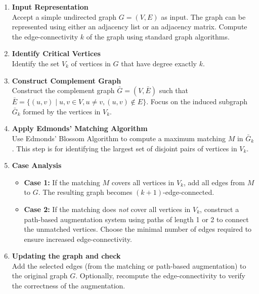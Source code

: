 \documentclass[12pt]{article}
\begin{document}
\begin{enumerate}
    \item \textbf{Input Representation} \\
    Accept a simple undirected graph $G = (V, E)$ as input. The graph can be represented using either an adjacency list or an adjacency matrix. Compute the edge-connectivity $k$ of the graph using standard graph algorithms.

    \item \textbf{Identify Critical Vertices} \\
    Identify the set $V_k$ of vertices in $G$ that have degree exactly $k$. 
    
    \item \textbf{Construct Complement Graph} \\
    Construct the complement graph $\bar{G} = (V, \bar{E})$ such that $\bar{E} = \{(u, v) \mid u, v \in V, u \neq v, (u, v) \notin E\}$. Focus on the induced subgraph $\bar{G}_k$ formed by the vertices in $V_k$.

    \item \textbf{Apply Edmonds’ Matching Algorithm} \\
    Use Edmonds’ Blossom Algorithm to compute a maximum matching $M$ in $\bar{G}_k$. This step is for identifying the largest set of disjoint pairs of vertices in $V_k$.

    \item \textbf{Case Analysis} \\
    \begin{itemize}
        \item \textbf{Case 1:} If the matching $M$ covers all vertices in $V_k$, add all edges from $M$ to $G$. The resulting graph becomes $(k + 1)$-edge-connected.
        \item \textbf{Case 2:} If the matching does \emph{not} cover all vertices in $V_k$, construct a path-based augmentation system using paths of length 1 or 2 to connect the unmatched vertices. Choose the minimal number of edges required to ensure increased edge-connectivity.
    \end{itemize}

    \item \textbf{Updating the graph and check} \\
    Add the selected edges (from the matching or path-based augmentation) to the original graph $G$. Optionally, recompute the edge-connectivity to verify the correctness of the augmentation.

\end{enumerate}
\end{document}
